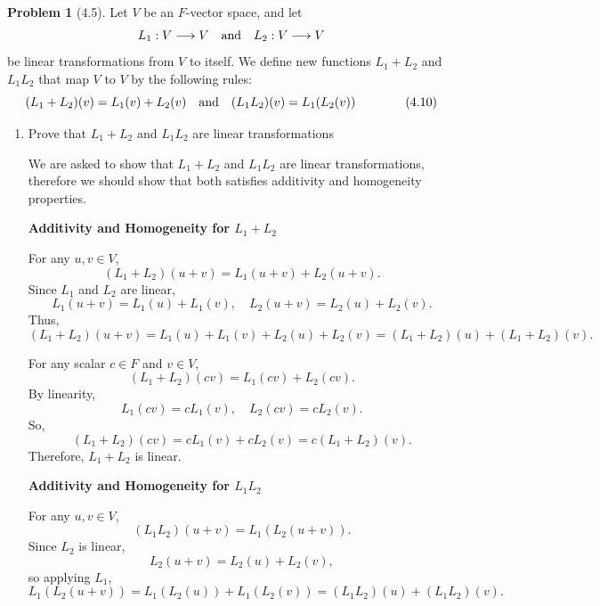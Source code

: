 \documentclass[12pt]{article}
\theoremstyle{definition}
\newtheorem{problem}{Problem}
\begin{document}
\begin{problem}[4.5]
    Let $V$ be an $F$-vector space, and let
    \[
        L_1: V \longrightarrow V \hspace{10px} \text{and} \hspace{10px} L_2: V \longrightarrow V
    \]
    be linear transformations from $V$ to itself. We define new functions $L_1 + L_2$ 
    and $L_1L_2$ that map $V$ to $V$ by the following rules:
    \[
        (L_1 + L_2)(v) = L_1(v) + L_2(v) \hspace{10px} \text{and} \hspace{10px} (L_1L_2)(v) = L_1(L_2(v)) \hspace{40px} \text{(4.10)}
    \]
    \begin{enumerate}[label=(\alph*)]
        \item Prove that $L_1 + L_2$ and $L_1L_2$ are linear transformations
        
        \begin{solution}
            We are asked to show that $L_1 + L_2$ and $L_1L_2$ are linear transformations, therefore
            we should show that both satisfies additivity and homogeneity properties.

            \textbf{Additivity and Homogeneity for $L_1 + L_2$}
            
            For any $u, v \in V$,
            \[
            (L_1 + L_2)(u + v) = L_1(u+v) + L_2(u+v).
            \]
            Since $L_1$ and $L_2$ are linear,
            \[
            L_1(u+v) = L_1(u) + L_1(v), \quad L_2(u+v) = L_2(u) + L_2(v).
            \]
            Thus,
            \[
            (L_1 + L_2)(u+v) = L_1(u) + L_1(v) + L_2(u) + L_2(v) = (L_1 + L_2)(u) + (L_1 + L_2)(v).
            \]
            
            For any scalar $c \in F$ and $v \in V$,
            \[
            (L_1 + L_2)(cv) = L_1(cv) + L_2(cv).
            \]
            By linearity,
            \[
            L_1(cv) = c L_1(v), \quad L_2(cv) = c L_2(v).
            \]
            So,
            \[
            (L_1 + L_2)(cv) = c L_1(v) + c L_2(v) = c (L_1 + L_2)(v).
            \]
            Therefore, $L_1 + L_2$ is linear.

            \textbf{Additivity and Homogeneity for $L_1L_2$}

            For any $u, v \in V$,
            \[
            (L_1 L_2)(u+v) = L_1(L_2(u+v)).
            \]
            Since $L_2$ is linear,
            \[
            L_2(u+v) = L_2(u) + L_2(v),
            \]
            so applying $L_1$,
            \[
            L_1(L_2(u+v)) = L_1(L_2(u)) + L_1(L_2(v)) = (L_1 L_2)(u) + (L_1 L_2)(v).
            \]
            

\end{solution}
\end{enumerate}
\end{problem}
\end{document}
